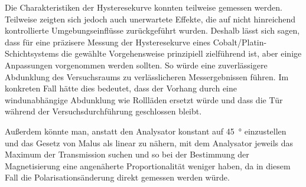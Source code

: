 \documentclass[
	a4paper,
	12pt,
	pagesize,
	ngerman
]{scrartcl}
\begin{document}
	Die Charakteristiken der Hysteresekurve konnten teilweise gemessen werden.
	Teilweise zeigten sich jedoch auch unerwartete Effekte, die auf nicht hinreichend kontrollierte Umgebungseinflüsse zurückgeführt wurden.
	Deshalb lässt sich sagen, dass für eine präzisere Messung der Hysteresekurve eines Cobalt/Platin-Schichtsystems die gewählte Vorgehensweise prinzipiell zielführend ist, aber einige Anpassungen vorgenommen werden sollten.
	So würde eine zuverlässigere Abdunklung des Versuchsraums zu verlässlicheren Messergebnissen führen. %
	Im konkreten Fall hätte dies bedeutet, dass der Vorhang durch eine windunabhängige Abdunklung wie Rollläden ersetzt würde und dass die Tür während der Versuchsdurchführung geschlossen bleibt.%
	
	Außerdem könnte man, anstatt den Analysator konstant auf \SI{45}{\degree} einzustellen und das Gesetz von Malus als linear zu nähern, mit dem Analysator jeweils das Maximum der Transmission suchen und so bei der Bestimmung der Magnetisierung eine angenäherte Proportionalität weniger haben, da in diesem Fall die Polarisationsänderung direkt gemessen werden würde. %
\end{document}
